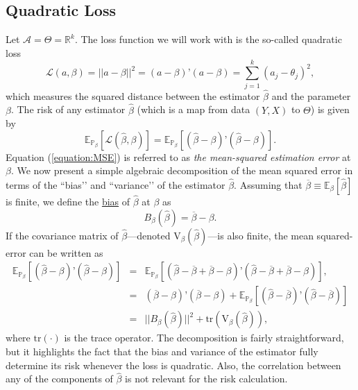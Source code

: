 \documentclass[11pt]{article} %
\begin{document}
\subsection{Quadratic Loss} 
Let $\mathcal{A} =\Theta = \mathbb{R}^{k}$. The loss function we will work with is the so-called quadratic loss
\[ \mathcal{L}(a, \beta) = || a- \beta ||^2 = (a-\beta)’(a-\beta) =  \sum_{j=1}^{k} (a_j  - \theta_j)^2,  \]
which measures the squared distance between the estimator $\widehat{\beta}$ and the parameter $\beta$. 
The risk of any estimator $\widehat{\beta}$ (which is a map from data $(Y,X)$ to $\Theta$) is given by
\begin{equation} \label{equation:MSE}
\mathbb{E}_{\mathbb{P}_{\beta}}[ \mathcal{L}(\widehat{\beta}, \beta) ] = \mathbb{E}_{\mathbb{P}_{\beta}}[ (\widehat{\beta}- \beta)’(\widehat{\beta}-\beta) ]. 
\end{equation}
Equation (\ref{equation:MSE}) is referred to as \emph{the mean-squared estimation error} at $\beta$. We now present a simple algebraic decomposition of the mean squared error in terms of the ``bias’’ and ``variance’’ of the estimator $\widehat{\beta}$. Assuming that $\overline{\beta}  \equiv \mathbb{E}_{\beta}[ \widehat{\beta} ]$ is finite, we define the \underline{bias} of $\widehat{\beta}$ at $\beta$ as
$$ B_\beta(\widehat{\beta}) = \overline{\beta} - \beta.$$
If the covariance matrix of $\widehat{\beta}$---denoted $\textrm{V}_{\beta} (\widehat{\beta})$---is also finite, the mean squared-error can be written as
\begin{eqnarray*}
\mathbb{E}_{\mathbb{P}_{\beta}}[ (\widehat{\beta}- \beta)’(\widehat{\beta}-\beta) ] &=& \mathbb{E}_{\mathbb{P}_{\beta}}[ (\widehat{\beta}-\overline{\beta} +\overline{\beta} - \beta)’(\widehat{\beta}-\overline{\beta} +\overline{\beta} -\beta) ],  \\
&=& (\overline{\beta}-\beta)’(\overline{\beta}-\beta) +  \mathbb{E}_{\mathbb{P}_{\beta}}[ (\widehat{\beta}-\overline{\beta} )’(\widehat{\beta}-\overline{\beta}) ]  \\
&=& ||B_\beta(\widehat{\beta})  ||^2 + \textrm{tr} \left( \textrm{V}_{\beta} (\widehat{\beta}) \right),
\end{eqnarray*}
where $\textrm{tr}(\cdot)$ is the trace operator.  The decomposition is fairly straightforward, but it highlights the fact that the bias and variance of the estimator fully determine its risk whenever the loss is quadratic. Also, the correlation between any of the components of $\widehat{\beta}$ is not relevant for the risk calculation. 
\end{document}
